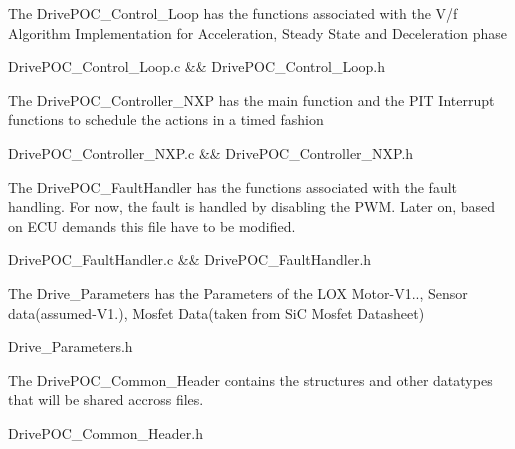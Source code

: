 The Drive\+POC\+\_\+\+Control\+\_\+\+Loop has the functions associated with the V/f Algorithm Implementation for Acceleration, Steady State and Deceleration phase \begin{DoxyVerb}DrivePOC_Control_Loop.c && DrivePOC_Control_Loop.h
\end{DoxyVerb}
 The Drive\+POC\+\_\+\+Controller\+\_\+\+NXP has the main function and the PIT Interrupt functions to schedule the actions in a timed fashion \begin{DoxyVerb}DrivePOC_Controller_NXP.c && DrivePOC_Controller_NXP.h
\end{DoxyVerb}
 The Drive\+POC\+\_\+\+Fault\+Handler has the functions associated with the fault handling. For now, the fault is handled by disabling the PWM. Later on, based on ECU demands this file have to be modified. \begin{DoxyVerb}DrivePOC_FaultHandler.c && DrivePOC_FaultHandler.h 
\end{DoxyVerb}
 The Drive\+\_\+\+Parameters has the Parameters of the LOX Motor-\/\+V1.., Sensor data(assumed-\/\+V1.), Mosfet Data(taken from Si\+C Mosfet Datasheet) \begin{DoxyVerb}Drive_Parameters.h
\end{DoxyVerb}
 The Drive\+POC\+\_\+\+Common\+\_\+\+Header contains the structures and other datatypes that will be shared accross files. \begin{DoxyVerb}DrivePOC_Common_Header.h
\end{DoxyVerb}


 
